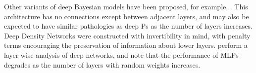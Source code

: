 \documentclass[twoside]{article}
\makeatletter
\newlength{\nonHumbleHeight}
\def\@humbleformat#1{{\settoheight{\nonHumbleHeight}{#1}\resizebox{!}{0.94\nonHumbleHeight}{#1}}}%
\def\humble#1{\@humbleformat{#1}}%
\newcommand{\gp}{{\humble GP}}
\makeatother
\begin{document}
Other variants of deep Bayesian models have been proposed, for example, \citep{adams2010learning}. %
This architecture has no connections except between adjacent layers, and may also be expected to have similar pathologies as deep \gp{}s as the number of layers increases.
%
Deep Density Networks \citep{rippel2013high} were constructed with invertibility in mind, with penalty terms encouraging the preservation of information about lower layers.
%
%
%
%
%
%
\cite{montavon2010layer} perform a layer-wise analysis of deep networks, and note that the performance of MLPs degrades as the number of layers with random weights increases.



\end{document}

